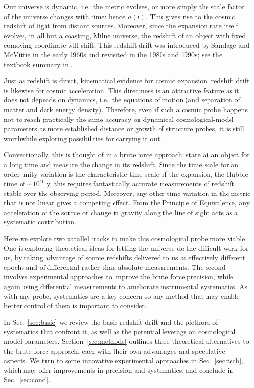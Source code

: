 \documentclass[preprint2, 10pt]{aastex}
\begin{document}
Our universe is dynamic, i.e.\ the metric evolves, or more simply the 
scale factor of the universe changes with time: hence $a(t)$.  This 
gives rise to the cosmic redshift of light from distant sources.  Moreover, 
since the expansion rate itself evolves, in all but a coasting, Milne 
universe, the redshift of an object with fixed comoving coordinate will shift.  This redshift drift was 
introduced by Sandage \citep{sandage} and McVittie \citep{mcvittie} in the 
early 1960s and revisited in the 1980s and 1990s; see the textbook 
summary in \citet{fpoc}. 

Just as redshift is direct, kinematical evidence for cosmic expansion, 
redshift drift is likewise for cosmic acceleration.  This directness is 
an attractive feature as it does not depends on dynamics, i.e.\ the equations 
of motion (and separation of matter and dark energy density). 
Therefore, 
even if such a cosmic probe happens not to reach practically the same 
accuracy on dynamical cosmological-model parameters as more established
distance or growth of structure probes,  it is still worthwhile exploring possibilities 
for carrying it out. 

Conventionally, this is thought of in a brute force approach: stare at an 
object for a long time and measure the change in its redshift.  
Since the time scale for an order unity variation is the characteristic 
time scale of the expansion, the Hubble time of $\sim10^{10}$ y, this 
requires fantastically accurate measurements of redshift stable over the 
observing period.  Moreover, any other time variation in the metric that 
is not linear gives a competing effect.  From the Principle of Equivalence, 
any acceleration of the source or change in gravity along the line of sight 
acts as a systematic contribution. 

Here we explore two parallel tracks to make this cosmological probe more 
viable. One is exploring theoretical ideas for letting the universe do the 
difficult work for us, by taking advantage of source redshifts delivered 
to us at effectively different epochs and of differential rather than absolute 
measurements.  The second involves experimental approaches to improve the 
brute force precision, while again using differential measurements to 
ameliorate instrumental systematics. As with any probe, systematics are a 
key concern so any method that may enable better control of them is 
important to consider. 

In Sec.~\ref{sec:basic} we review the basic redshift drift and the plethora 
of systematics that confront it, as well as the potential leverage on 
cosmological model parameters.  Section~\ref{sec:methods} outlines three 
theoretical alternatives to the brute force approach, each with their own 
advantages and speculative aspects. 
We turn to some innovative experimental approaches in Sec.~\ref{sec:tech}, 
which may offer improvements in precision and systematics, and conclude in 
Sec.~\ref{sec:concl}. 
\end{document}
